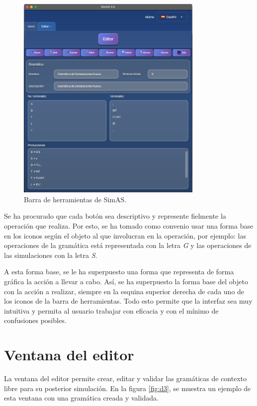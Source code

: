 \begin{figure}[htp]
\centering
	\includegraphics[width=0.8\textwidth]{figuras2/editor/editor.png}
	\caption{Barra de herramientas de SimAS.}
	\label{fig:d2}
\end{figure}

Se ha procurado que cada botón sea descriptivo y represente fielmente la operación que realiza. Por esto, se ha tomado como convenio usar una forma base en los iconos según el objeto al que involucran en la operación, por ejemplo: las operaciones de la gramática está representada con la letra \textit{G} y las operaciones de las simulaciones con la letra \textit{S}.

A esta forma base, se le ha superpuesto una forma que representa de forma gráfica la acción a llevar a cabo. Así, se ha superpuesto la forma base del objeto con la acción a realizar, siempre en la esquina superior derecha de cada uno de los iconos de la barra de herramientas. Todo esto permite que la interfaz sea muy intuitiva y permita al usuario trabajar con eficacia y con el mínimo de confusiones posibles.
  

\section{Ventana del editor}

La ventana del editor permite crear, editar y validar las gramáticas de contexto libre para su posterior simulación. En la figura \ref{fig:d3}, se muestra un ejemplo de esta ventana con una gramática creada y validada.

